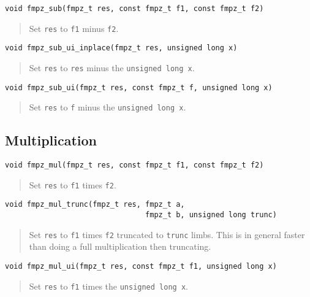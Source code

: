 \documentclass[a4paper,10pt]{article}
\newcommand{\code}{\lstinline}
\begin{document}
\begin{lstlisting}
void fmpz_sub(fmpz_t res, const fmpz_t f1, const fmpz_t f2)
\end{lstlisting}
\begin{quote}
Set \code{res} to \code{f1} minus \code{f2}.
\end{quote}

\begin{lstlisting}
void fmpz_sub_ui_inplace(fmpz_t res, unsigned long x)
\end{lstlisting}
\begin{quote}
Set \code{res} to \code{res} minus the \code{unsigned long x}.
\end{quote}

\begin{lstlisting}
void fmpz_sub_ui(fmpz_t res, const fmpz_t f, unsigned long x)
\end{lstlisting}
\begin{quote}
Set \code{res} to \code{f} minus the \code{unsigned long x}.
\end{quote}

\subsection{Multiplication}

\begin{lstlisting}
void fmpz_mul(fmpz_t res, const fmpz_t f1, const fmpz_t f2)
\end{lstlisting}
\begin{quote}
Set \code{res} to \code{f1} times \code{f2}.
\end{quote}

\begin{lstlisting}
void fmpz_mul_trunc(fmpz_t res, fmpz_t a, 
                                fmpz_t b, unsigned long trunc) 
\end{lstlisting}
\begin{quote}
Set \code{res} to \code{f1} times \code{f2} truncated to \code{trunc} limbs. This is in general faster than doing a full multiplication then truncating.
\end{quote}

\begin{lstlisting}
void fmpz_mul_ui(fmpz_t res, const fmpz_t f1, unsigned long x)
\end{lstlisting}
\begin{quote}
Set \code{res} to \code{f1} times the \code{unsigned long x}.
\end{quote}
\end{document}
